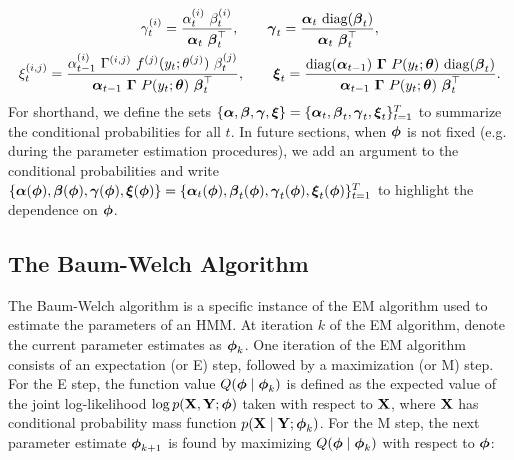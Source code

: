 \begin{gather}
    \gamma^{(i)}_t = \frac{\alpha^{(i)}_{t} ~ \beta^{(i)}_{t}}{\boldsymbol{\alpha}_{t} ~ \boldsymbol{\beta}_t^\top}, \qquad \boldsymbol{\gamma}_t = \frac{\boldsymbol{\alpha}_t ~ \text{diag}(\boldsymbol{\beta}_t)}{\boldsymbol{\alpha}_t ~ \boldsymbol{\beta}_t^\top} \label{eqn:gamma}, \\
    \xi_{t}^{(i,j)} = \frac{\alpha_{t-1}^{(i)} ~ \Gamma^{(i,j)} ~ f^{(j)}(y_{t};\theta^{(j)}) ~ \beta_{t}^{(j)}}{\boldsymbol{\alpha}_{t-1} ~ \boldsymbol{\Gamma} ~ P(y_{t};\boldsymbol{\theta}) ~ \boldsymbol{\beta}_{t}^\top}, \qquad \boldsymbol{\xi}_t = \frac{\text{diag}(\boldsymbol{\alpha}_{t-1}) ~ \boldsymbol{\Gamma} ~ P(y_t;\boldsymbol{\theta}) ~ \text{diag}(\boldsymbol{\beta}_t)}{\boldsymbol{\alpha}_{t-1} ~ \boldsymbol{\Gamma} ~ P(y_{t};\boldsymbol{\theta}) ~ \boldsymbol{\beta}_{t}^\top} \label{eqn:xi}.
\end{gather}
%
%
For shorthand, we define the sets $\{\boldsymbol{\alpha}, \boldsymbol{\beta}, \boldsymbol{\gamma}, \boldsymbol{\xi}\} = \{\boldsymbol{\alpha}_t, \boldsymbol{\beta}_t, \boldsymbol{\gamma}_t, \boldsymbol{\xi}_t\}_{t=1}^T$ to summarize the conditional probabilities for all $t$. In future sections, when $\boldsymbol{\phi}$ is not fixed (e.g. during the parameter estimation procedures), we add an argument to the conditional probabilities and write $\{\boldsymbol{\alpha}(\boldsymbol{\phi}), \boldsymbol{\beta}(\boldsymbol{\phi}), \boldsymbol{\gamma}(\boldsymbol{\phi}), \boldsymbol{\xi}(\boldsymbol{\phi})\} = \{\boldsymbol{\alpha}_t(\boldsymbol{\phi}), \boldsymbol{\beta}_t(\boldsymbol{\phi}), \boldsymbol{\gamma}_t(\boldsymbol{\phi}), \boldsymbol{\xi}_t(\boldsymbol{\phi})\}_{t=1}^T$ to highlight the dependence on $\boldsymbol{\phi}$. 

\subsection{The Baum-Welch Algorithm}

The Baum-Welch algorithm is a specific instance of the EM algorithm used to estimate the parameters of an HMM. %
At iteration $k$ of the EM algorithm, denote the current parameter estimates as $\boldsymbol{\phi}_{k}$. One iteration of the EM algorithm consists of an expectation (or E) step, followed by a maximization (or M) step. For the E step, the function value $Q(\boldsymbol{\phi} \mid \boldsymbol{\phi}_{k})$ is defined as the expected value of the joint log-likelihood $\log p(\mathbf{X},\mathbf{Y}; \boldsymbol{\phi})$ taken with respect to $\mathbf{X}$, where $\mathbf{X}$ has conditional probability mass function $p(\mathbf{X} \mid \mathbf{Y} ; \boldsymbol{\phi}_{k})$. For the M step, the next parameter estimate $\boldsymbol{\phi}_{k+1}$ is found by maximizing $Q(\boldsymbol{\phi} \mid \boldsymbol{\phi}_{k})$ with respect to $\boldsymbol{\phi}$:

